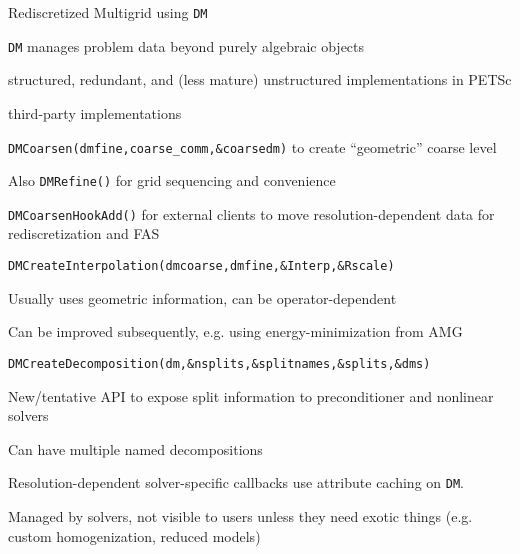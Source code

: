 \begin{frame}{Rediscretized Multigrid using \texttt{DM}}
  \begin{itemize}
{\scriptsize
  \item \texttt{DM} manages problem data beyond purely algebraic objects
    \begin{itemize}
{\scriptsize
    \item structured, redundant, and (less mature) unstructured implementations in PETSc
    \item third-party implementations
}
    \end{itemize}
  \item \texttt{DMCoarsen(dmfine,coarse\_comm,\&coarsedm)} to create ``geometric'' coarse level
    \begin{itemize}
{\scriptsize
    \item Also \texttt{DMRefine()} for grid sequencing and convenience
    \item \texttt{DMCoarsenHookAdd()} for external clients to move resolution-dependent data for rediscretization and FAS
}
    \end{itemize}
  \item \texttt{DMCreateInterpolation(dmcoarse,dmfine,\&Interp,\&Rscale)}
    \begin{itemize}
{\scriptsize
    \item Usually uses geometric information, can be operator-dependent
    \item Can be improved subsequently, e.g. using energy-minimization from AMG
}
    \end{itemize}
  \item \texttt{DMCreateDecomposition(dm,\&nsplits,\&splitnames,\&splits,\&dms)}
    \begin{itemize}
{\scriptsize
    \item New/tentative API to expose split information to preconditioner and nonlinear solvers
    \item Can have multiple named decompositions
}
    \end{itemize}
  \item Resolution-dependent solver-specific callbacks use attribute caching on \texttt{DM}.
    \begin{itemize}
{\scriptsize
    \item Managed by solvers, not visible to users unless they need exotic things (e.g. custom homogenization, reduced models)
}
    \end{itemize}
}
  \end{itemize}
\end{frame}
